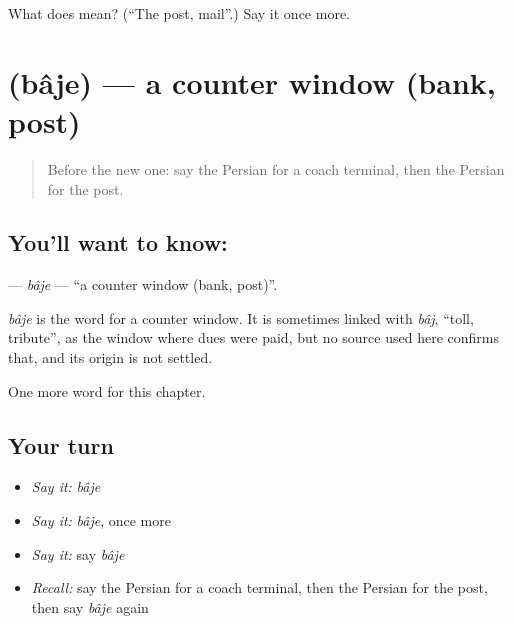 \begin{tcolorbox}[breakable,colback=teal!4,colframe=teal!35!black,title={Before you move on}]
What does  mean? (\textquotedblleft{}The post, mail\textquotedblright{}.) Say it once more.
\end{tcolorbox}
\section[\texorpdfstring{\fa{باجه} (bâje)}{باجه (bâje)}]{ (bâje) — a counter window (bank, post)}

\label{lesson:FA-C194-baje}



\begin{quote}
Before the new one: say the Persian for a coach terminal, then the Persian for the post.
\end{quote}

\subsection*{You'll want to know: }
\textbf{} — \emph{bâje} — \textquotedblleft{}a counter window (bank, post)\textquotedblright{}.

\begin{cousinweb}
\emph{bâje} is the word for a counter window. It is sometimes linked with \emph{bâj}, \textquotedblleft{}toll, tribute\textquotedblright{}, as the window where dues were paid, but no source used here confirms that, and its origin is not settled.
\end{cousinweb}

\begin{grammarlens}[title={What you've built}]
One more word for this chapter.
\end{grammarlens}

\subsection*{Your turn}
\begin{itemize}
\raggedright
  \item \emph{Say it:} \emph{bâje}
  \item \emph{Say it:} \emph{bâje}, once more
  \item \emph{Say it:} say \emph{bâje}
  \item \emph{Recall:} say the Persian for a coach terminal, then the Persian for the post, then say \emph{bâje} again
\end{itemize}

